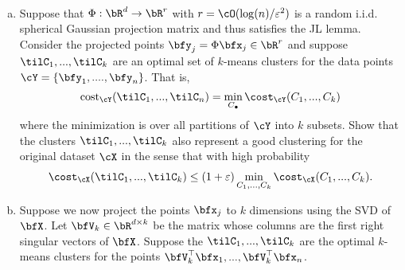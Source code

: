 \begin{homework}[e]
\begin{align*}
  \end{align*}
  \begin{enumerate}[(a)]
    \item Suppose that $\Phi:\bR^d \to \bR^r$ with $r = \cO(\log(n)/\epsilon^2)$ is a random i.i.d. spherical Gaussian projection matrix and thus satisfies the JL lemma. Consider the projected points $\bfy_j = \Phi\bfx_j\in \bR^r$ and suppose $\tilC_1,...,\tilC_k$ are an optimal set of $k$-means clusters for the data points $\cY = \{\bfy_1,....,\bfy_n\}$. That is,
    \begin{align*}
      \operatorname{cost}_{\cY}(\tilC_1,...,\tilC_n) = \min_{C_\bullet}\cost_{\cY}(C_1,...,C_k)
    \end{align*}
    where the minimization is over all partitions of $\cY$ into $k$ subsets. Show that the clusters $\tilC_1,...,\tilC_k$ also represent a good clustering for the original dataset $\cX$ in the sense that with high probability
    \begin{align*}
      \cost_\cX(\tilC_1,...,\tilC_k) \leq (1 + \epsilon)\min_{C_1,...,C_k}\cost_\cX(C_1,...,C_k).
    \end{align*}

  \item Suppose we now project the points $\bfx_j$ to $k$ dimensions using the SVD of $\bfX$. Let $\bfV_k\in \bR^{d\times k}$ be the matrix whose columns are the first right singular vectors of $\bfX$. Suppose the $\tilC_1,...,\tilC_k$ are the optimal $k$-means clusters for the points $\bfV_k^\top\bfx_1,...,\bfV_k^\top\bfx_n$.


\end{enumerate}
\end{homework}
